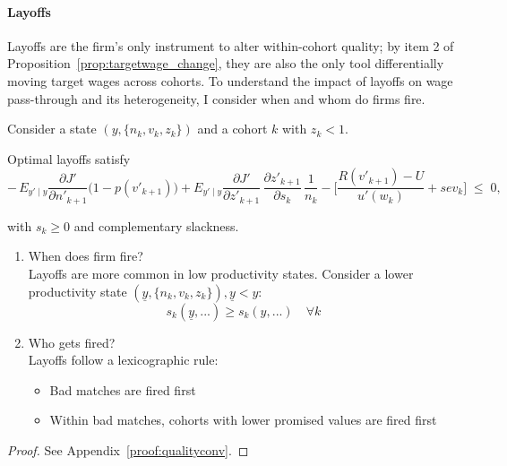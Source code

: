 \paragraph{Layoffs}
Layoffs are the firm’s only instrument to alter within-cohort quality; by item 2 of Proposition~\ref{prop:targetwage_change}, they are also the only tool differentially moving target wages across cohorts. To understand the impact of layoffs on wage pass-through and its heterogeneity, I consider when and whom do firms fire.

\begin{proposition}\label{prop:qualityconv}
Consider a state $(y,\{n_k,v_k,z_k\})$ and a cohort $k$ with $z_k<1$. 

Optimal layoffs satisfy
\[
-\,E_{y'\mid y}\frac{\partial J'}{\partial n'_{k+1}}\big(1-p(v'_{k+1})\big)
+ E_{y'\mid y}\frac{\partial J'}{\partial z'_{k+1}}\,\frac{\partial z'_{k+1}}{\partial s_k}\,\frac{1}{n_k}
- \Big[\frac{R(v'_{k+1})-U}{u'(w_k)} + sev_k\Big]\;\le\; 0,
\]

with $s_k\ge 0$ and complementary slackness.
\begin{enumerate}
    \item When does firm fire? \\
    Layoffs are more common in low productivity states. Consider a lower productivity state $(\underline{y},\{n_k,v_k,z_k\}),\underline{y} < y$:
\[s_k(\underline{y},...) \geq s_k(y,...) \quad  \forall k\]

\item Who gets fired? \\
Layoffs follow a lexicographic rule:
\begin{itemize}
    \item Bad matches are fired first
    \item Within bad matches, cohorts with lower promised values are fired first
\end{itemize}

\end{enumerate}
\end{proposition}
\begin{proof}
See Appendix~\ref{proof:qualityconv}.
\end{proof}

